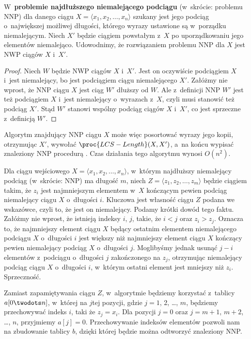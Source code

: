 \exercise %
W~\textbf{problemie najdłuższego niemalejącego podciągu} (w~skrócie: problemu NNP) dla danego ciągu $X=\langle x_1,x_2,\dots,x_n\rangle$ szukany jest jego podciąg o~największej możliwej długości, którego wyrazy ustawione są w~porządku niemalejącym.
Niech $X'$ będzie ciągiem powstałym z~$X$ po uporządkowaniu jego elementów niemalejąco.
Udowodnimy, że rozwiązaniem problemu NNP dla $X$ jest NWP ciągów $X$ i~$X'$.

\begin{proof}
Niech $W$ będzie NWP ciągów $X$ i~$X'$.
Jest on oczywiście podciągiem $X$ i~jest niemalejący, bo jest podciągiem ciągu niemalejącego $X'$.
Załóżmy nie wprost, że NNP ciągu $X$ jest ciąg $W'$ dłuższy od $W$.
Ale z~definicji NNP $W'$ jest też podciągiem $X$ i~jest niemalejący o~wyrazach z~$X$, czyli musi stanowić też podciąg $X'$.
Stąd $W'$ stanowi wspólny podciąg ciągów $X$ i~$X'$, co jest sprzeczne z~definicją $W'$.
\end{proof}

Algorytm znajdujący NNP ciągu $X$ może więc posortować wyrazy jego kopii, otrzymując $X'$, wywołać $\proc{LCS-Length}(X,X')$, a~na końcu wypisać znaleziony NNP procedurą .
Czas działania tego algorytmu wynosi $O(n^2)$.

\exercise %
Dla ciągu wejściowego $X=\langle x_1,x_2,\dots,x_n\rangle$, w~którym najdłuższy niemalejący podciąg (w~skrócie: NNP) ma długość $m$, niech $Z=\langle z_1,z_2,\dots,z_m\rangle$ będzie ciągiem takim, że $z_i$ jest najmniejszym elementem w~$X$ kończącym pewien podciąg niemalejący ciągu $X$ o~długości $i$.
Kluczowa jest własność ciągu $Z$ podana we wskazówce, czyli to, że jest on niemalejący.
Podamy krótki dowód tego faktu.
Załóżmy nie wprost, że istnieją indeksy $i$, $j$, takie, że $i<j$ oraz $z_i>z_j$.
Oznacza to, że najmniejszy element ciągu $X$ będący ostatnim elementem niemalejącego podciągu $X$ o~długości $i$ jest większy niż najmniejszy element ciągu $X$ kończący pewien niemalejący podciąg $X$ o~długości $j$.
Moglibyśmy jednak usunąć $j-i$ elementów z~podciągu o~długości $j$ zakończonego na $z_j$, otrzymując niemalejący podciąg ciągu $X$ o~długości $i$, w~którym ostatni element jest mniejszy niż $z_i$.
Sprzeczność.

Zamiast zapamiętywania ciągu $Z$, w~algorytmie będziemy korzystać z~tablicy $a[0\twodots n]$, w~której na $j$\nbhyphen tej pozycji, gdzie $j=1$, 2, \dots, $m$, będziemy przechowywać indeks $i$, taki że $z_j=x_i$.
Dla pozycji $j=0$ oraz $j=m+1$, $m+2$, \dots, $n$, przyjmiemy $a[j]=0$.
Przechowywanie indeksów elementów pozwoli nam na zbudowanie tablicy $b$, dzięki której będzie można odtworzyć znaleziony NNP\@.

